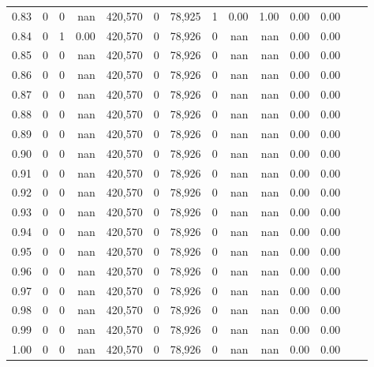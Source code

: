 \begin{tabular}{rrrrrrrrrrrrrr}
0.83 &       0 &      0 &     nan &  420,570 &        0 &  78,925 &       1 &  0.00 &  1.00 &  0.00 &      0.00 \\
0.84 &       0 &      1 &    0.00 &  420,570 &        0 &  78,926 &       0 &   nan &   nan &  0.00 &      0.00 \\
0.85 &       0 &      0 &     nan &  420,570 &        0 &  78,926 &       0 &   nan &   nan &  0.00 &      0.00 \\
0.86 &       0 &      0 &     nan &  420,570 &        0 &  78,926 &       0 &   nan &   nan &  0.00 &      0.00 \\
0.87 &       0 &      0 &     nan &  420,570 &        0 &  78,926 &       0 &   nan &   nan &  0.00 &      0.00 \\
0.88 &       0 &      0 &     nan &  420,570 &        0 &  78,926 &       0 &   nan &   nan &  0.00 &      0.00 \\
0.89 &       0 &      0 &     nan &  420,570 &        0 &  78,926 &       0 &   nan &   nan &  0.00 &      0.00 \\
0.90 &       0 &      0 &     nan &  420,570 &        0 &  78,926 &       0 &   nan &   nan &  0.00 &      0.00 \\
0.91 &       0 &      0 &     nan &  420,570 &        0 &  78,926 &       0 &   nan &   nan &  0.00 &      0.00 \\
0.92 &       0 &      0 &     nan &  420,570 &        0 &  78,926 &       0 &   nan &   nan &  0.00 &      0.00 \\
0.93 &       0 &      0 &     nan &  420,570 &        0 &  78,926 &       0 &   nan &   nan &  0.00 &      0.00 \\
0.94 &       0 &      0 &     nan &  420,570 &        0 &  78,926 &       0 &   nan &   nan &  0.00 &      0.00 \\
0.95 &       0 &      0 &     nan &  420,570 &        0 &  78,926 &       0 &   nan &   nan &  0.00 &      0.00 \\
0.96 &       0 &      0 &     nan &  420,570 &        0 &  78,926 &       0 &   nan &   nan &  0.00 &      0.00 \\
0.97 &       0 &      0 &     nan &  420,570 &        0 &  78,926 &       0 &   nan &   nan &  0.00 &      0.00 \\
0.98 &       0 &      0 &     nan &  420,570 &        0 &  78,926 &       0 &   nan &   nan &  0.00 &      0.00 \\
0.99 &       0 &      0 &     nan &  420,570 &        0 &  78,926 &       0 &   nan &   nan &  0.00 &      0.00 \\
1.00 &       0 &      0 &     nan &  420,570 &        0 &  78,926 &       0 &   nan &   nan &  0.00 &      0.00 \\
\bottomrule
\end{tabular}
